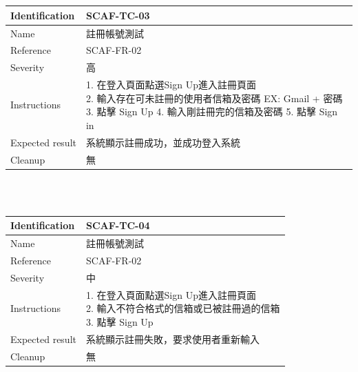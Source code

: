 \documentclass{report}
\begin{document}
\\
\newline
\\
\begin{tabularx}{\textwidth}{
  |p{}%
  |p{}|%
  }
  \hline
  \centering Identification &  SCAF-TC-03 \\
  \hline
  \centering Name & 註冊帳號測試 \\
  \hline
  \centering Reference & SCAF-FR-02 \\
  \hline
  \centering Severity & 高 \\
  \hline
  \centering Instructions & 
  \makecell[l]{
    1. 在登入頁面點選Sign Up進入註冊頁面 \\
    2. 輸入存在可未註冊的使用者信箱及密碼 EX: Gmail + 密碼 \\
    3. 點擊 Sign Up
    4. 輸入剛註冊完的信箱及密碼
    5. 點擊 Sign in
  }\\
  \hline
  \centering Expected result & 系統顯示註冊成功，並成功登入系統 \\
  \hline
  \centering Cleanup & 無 \\
  \hline
\end{tabularx}
\\
\newline
\\
\begin{tabularx}{\textwidth}{
  |p{}%
  |p{}|%
  }
  \hline
  \centering Identification &  SCAF-TC-04 \\
  \hline
  \centering Name & 註冊帳號測試 \\
  \hline
  \centering Reference & SCAF-FR-02 \\
  \hline
  \centering Severity & 中 \\
  \hline
  \centering Instructions & 
  \makecell[l]{
    1. 在登入頁面點選Sign Up進入註冊頁面 \\
    2. 輸入不符合格式的信箱或已被註冊過的信箱  \\
    3. 點擊 Sign Up
  }\\
  \hline
  \centering Expected result & 系統顯示註冊失敗，要求使用者重新輸入 \\
  \hline
  \centering Cleanup & 無 \\
  \hline
\end{tabularx}
\\
\newline
\end{document}
